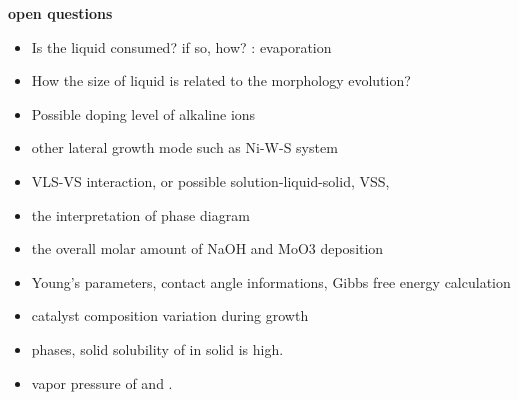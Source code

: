 \textbf{open questions}
\begin{itemize}
\item Is the liquid consumed? if so, how? : evaporation
\item How the size of liquid is related to the morphology evolution?
\item Possible doping level of alkaline ions
\item other lateral growth mode such as Ni-W-S system
\item VLS-VS interaction, or possible solution-liquid-solid, VSS,
\item the interpretation of phase diagram
\item the overall molar amount of NaOH and MoO3 deposition
\item Young's parameters, contact angle informations, Gibbs free energy calculation
\item catalyst composition variation during growth
\item {} phases, solid solubility of  in solid  is high. 
\item vapor pressure of  and .
\end{itemize}

